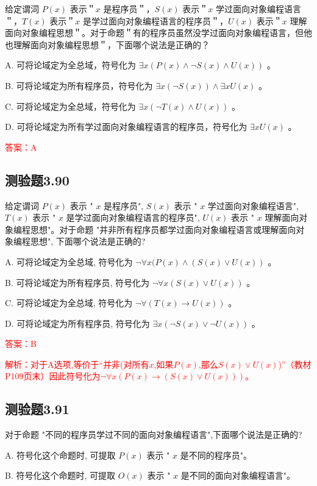 \documentclass[UTF8, heading=true]{ctexart}
\begin{document}
给定谓泀 $P(x)$ 表示＂$x$ 是程序员＂，$S(x)$ 表示＂$x$ 学过面向对象编程语言＂，$T(x)$ 表示＂$x$ 是学过面向对象编程语言的程序员＂，$U(x)$ 表示＂$x$ 理解面向对象编程思想＂。对于命题＂有的程序员虽然没学过面向对象编程语言，但他也理解面向对象编程思想＂，下面哪个说法是正确的？

A. 可将论域定为全总域，符号化为 $\exists x(P(x) \wedge \neg S(x) \wedge U(x))$ 。

B. 可将论域定为所有程序员，符号化为 $\exists x(\neg S(x)) \wedge \exists x U(x)$ 。

C. 可将论域定为全总域，符号化为 $\exists x(\neg T(x) \wedge U(x))$ 。

D. 可将论域定为所有学过面向对象编程语言的程序员，符号化为 $\exists x U(x)$ 。


\textcolor{red}{答案：A}

\subsection{测验题3.90}

给定谓词 $P(x)$ 表示 " $x$ 是程序员", $S(x)$ 表示 " $x$ 学过面向对象编程语言", $T(x)$ 表示 " $x$ 是学过面向对象编程语言的程序员", $U(x)$ 表示 " $x$ 理解面向对象编程思想"。对于命题 "并非所有程序员都学过面向对象编程语言或理解面向对象编程思想", 下面哪个说法是正确的?

A. 可将论域定为全总域, 符号化为 $\neg \forall x(P(x) \wedge(S(x) \vee U(x))$ 。

B. 可将论域定为所有程序员, 符号化为 $\neg \forall x(S(x) \vee U(x))$ 。

C. 可将论域定为全总域, 符号化为 $\neg \forall(T(x) \rightarrow U(x))$ 。

D. 可将论域定为所有程序员, 符号化为 $\exists x(\neg S(x) \vee \neg U(x))$ 。

\textcolor{red}{答案：B}

\textcolor{red}{解析：对于A选项,等价于“并非(对所有$x$,如果$P(x)$,那么$S(x) \vee U(x)$)”（教材P109页末）因此符号化为$\neg \forall x(P(x) \rightarrow (S(x) \vee U(x)))$。}

\subsection{测验题3.91}

对于命题 "不同的程序员学过不同的面向对象编程语言",下面哪个说法是正确的?

A. 符号化这个命题时, 可提取 $P(x)$ 表示 " $x$ 是不同的程序员"。

B. 符号化这个命题时, 可提取 $O(x)$ 表示 " $x$ 是不同的面向对象编程语言"。
\end{document}
